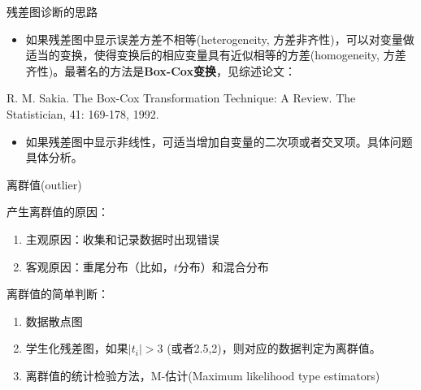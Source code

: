 \documentclass[ignorenonframetext,]{beamer}
\providecommand{\tightlist}{%
  \setlength{\itemsep}{0pt}\setlength{\parskip}{0pt}}
\begin{document}
\begin{frame}{残差图诊断的思路}

\begin{itemize}
\tightlist
\item
  如果残差图中显示误差方差不相等(heterogeneity,
  方差非齐性)，可以对变量做适当的变换，使得变换后的相应变量具有近似相等的方差(homogeneity,
  方差齐性)。最著名的方法是\textbf{Box-Cox变换}，见综述论文：
\end{itemize}

R. M. Sakia. The Box-Cox Transformation Technique: A Review. The
Statistician, 41: 169-178, 1992.

\begin{itemize}
\tightlist
\item
  如果残差图中显示非线性，可适当增加自变量的二次项或者交叉项。具体问题具体分析。
\end{itemize}

\end{frame}

\begin{frame}{离群值(outlier)}
\protect\hypertarget{outlier}{}

产生离群值的原因：

\begin{enumerate}
\item
  主观原因：收集和记录数据时出现错误
\item
  客观原因：重尾分布（比如，\(t\)分布）和混合分布
\end{enumerate}

离群值的简单判断：

\begin{enumerate}
\item
  数据散点图
\item
  学生化残差图，如果\(|t_i|>3\) (或者2.5,2)，则对应的数据判定为离群值。
\item
  离群值的统计检验方法，M-估计(Maximum likelihood type estimators)
\end{enumerate}

\end{frame}
\end{document}
